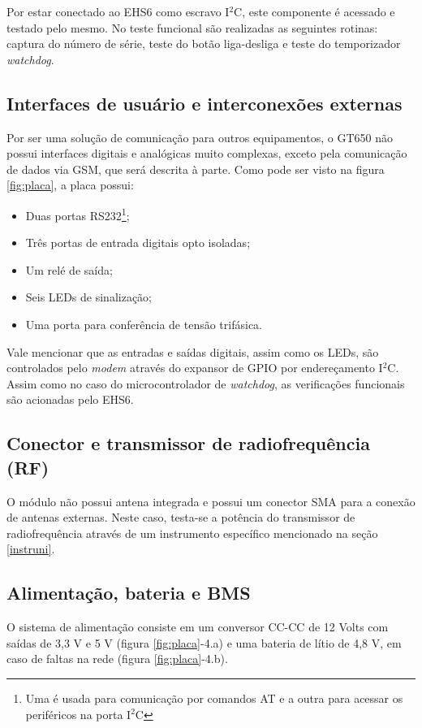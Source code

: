         Por estar conectado ao EHS6 como escravo I$^{2}$C, este componente é acessado e testado pelo mesmo. No teste funcional são realizadas as seguintes rotinas: captura do número de série, teste do botão liga-desliga e teste do temporizador \textit{watchdog}.
        
    \subsection{Interfaces de usuário e interconexões externas}
        Por ser uma solução de comunicação para outros equipamentos, o GT650 não possui interfaces digitais e analógicas muito complexas, exceto pela comunicação de dados via GSM, que será descrita à parte. Como pode ser visto na figura \ref{fig:placa}, a placa possui:
        
        \begin{itemize}
            \item Duas portas RS232\footnote{Uma é usada para comunicação por comandos AT e a outra para acessar os periféricos na porta I$^{2}$C};
            \item Três portas de entrada digitais opto isoladas; 
            \item Um relé de saída;
            \item Seis LEDs de sinalização;
            \item Uma porta para conferência de tensão trifásica.
        \end{itemize}
        
        Vale mencionar que as entradas e saídas digitais, assim como os LEDs, são controlados pelo \textit{modem} através do expansor de GPIO por endereçamento I$^{2}$C. Assim como no caso do microcontrolador de \textit{watchdog}, as verificações funcionais são acionadas pelo EHS6.

    \subsection{Conector e transmissor de radiofrequência (RF)}            
        
        O módulo não possui antena integrada e possui um conector SMA para a conexão de antenas externas. Neste caso, testa-se a potência do transmissor de radiofrequência através de um instrumento específico mencionado na seção \ref{instruni}.
            
    \subsection{Alimentação, bateria e BMS}
        O sistema de alimentação consiste em um conversor CC-CC de 12 Volts com saídas de 3,3 V e 5 V (figura \ref{fig:placa}-4.a) e uma bateria de lítio de 4,8 V, em caso de faltas na rede (figura \ref{fig:placa}-4.b). 
        
